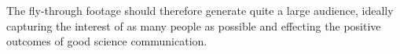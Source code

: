 \documentclass[pra, reprint, A4 paper, bibnotes]{revtex4-1}
\begin{document}
The fly-through footage should therefore generate quite a large audience, ideally capturing the interest of as many people as possible and effecting the positive outcomes of good science communication. 


\end{document}
